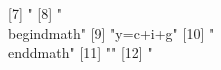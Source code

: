   [7] "%
  [8] "\\begin{dmath}"                                                                                                                                                                                                                                                                                                                                                                                                                                                                              
  [9] "{y}={c}+{i}+{g}"                                                                                                                                                                                                                                                                                                                                                                                                                                                                             
 [10] "\\end{dmath}"                                                                                                                                                                                                                                                                                                                                                                                                                                                                                
 [11] ""                                                                                                                                                                                                                                                                                                                                                                                                                                                                                            
 [12] "%
